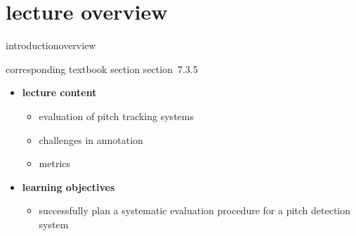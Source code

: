 


\subtitle{module 7.3.5: fundamental frequency detection~---~evaluation}


	

    \section[overview]{lecture overview}
        \begin{frame}{introduction}{overview}
            \begin{block}{corresponding textbook section}
                    section~7.3.5
            \end{block}

            \begin{itemize}
                \item   \textbf{lecture content}
                    \begin{itemize}
                        \item   evaluation of pitch tracking  systems
                        \item   challenges in annotation
                        \item   metrics
                    \end{itemize}
                \bigskip
                \item<2->   \textbf{learning objectives}
                    \begin{itemize}
                        \item   successfully plan a systematic evaluation procedure for a pitch detection system
                    \end{itemize}
            \end{itemize}
        \end{frame}
        
